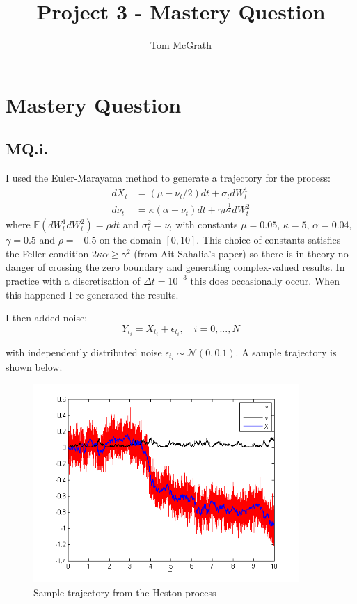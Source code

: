 \documentclass[11pt]{article} %
\title{Project 3 - Mastery Question}
\author{Tom McGrath}
\begin{document}
\maketitle

\section{Mastery Question}

\subsection{MQ.i.}
I used the Euler-Marayama method to generate a trajectory for the process:
\begin{align}
	dX_{t} &= (\mu - \nu_{t}/2)dt + \sigma_{t}dW^{1}_{t}\\
	d\nu_{t} &= \kappa(\alpha - \nu_{t})dt + \gamma\nu^{\frac{1}{2}}dW^{2}_{t}
\end{align}
where $\mathbb{E}(dW^{1}_{t}dW^{2}_{t})=\rho dt$ and $\sigma^{2}_{t} = \nu_{t}$ with constants $\mu = 0.05$, $\kappa = 5$, $\alpha = 0.04$, $\gamma = 0.5$ and $\rho = -0.5$ on the domain $[0,10]$. This choice of constants satisfies the Feller condition $2\kappa\alpha \geq \gamma^{2}$ (from Ait-Sahalia's paper) so there is in theory no danger of crossing the zero boundary and generating complex-valued results. In practice with a discretisation of $\Delta t = 10^{-3}$ this does occasionally occur. When this happened I re-generated the results.
\newline

I then added noise:
\begin{equation}
	Y_{t_{i}} = X_{t_{i}} + \epsilon_{t_{i}},\quad i = 0,...,N
\end{equation}

with independently distributed noise $\epsilon_{t_{i}} \sim \mathcal{N}(0,0.1)$. A sample trajectory is shown below.
\begin{figure}[h!]
\centering
\includegraphics[width = 0.9\textwidth]{MQtraj.png}
\caption{Sample trajectory from the Heston process}
\end{figure}
\end{document}
